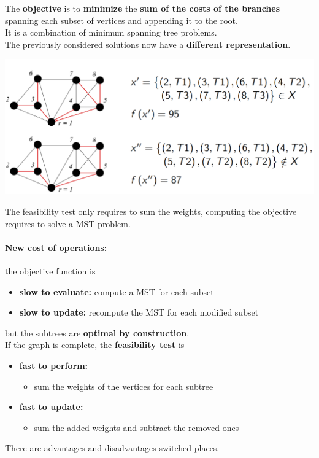 The \textbf{objective} is to \textbf{minimize} the \textbf{sum of the costs of the branches} spanning each subset of vertices and appending it to the root.\\
It is a combination of minimum spanning tree problems.\\

The previously considered solutions now have a \textbf{different representation}.
\begin{center}
	\includegraphics[width=0.9\columnwidth]{img/CSTP2}
\end{center}
The feasibility test only requires to sum the weights, computing the objective requires to solve a MST problem.

\newpage

\paragraph{New cost of operations:} the objective function is
\begin{itemize}
	\item \textbf{slow to evaluate:} compute a MST for each subset
	\item \textbf{slow to update:} recompute the MST for each modified subset
\end{itemize}
but the subtrees are \textbf{optimal by construction}.\\

If the graph is complete, the \textbf{feasibility test} is
\begin{itemize}
	\item \textbf{fast to perform:}
	\begin{itemize}
		\item sum the weights of the vertices for each subtree
	\end{itemize}
	\item \textbf{fast to update:}
	\begin{itemize}
		\item sum the added weights and subtract the removed ones
	\end{itemize}
\end{itemize}
There are advantages and disadvantages switched places.\\

